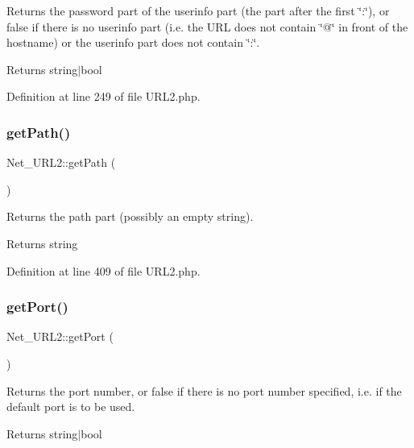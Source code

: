 Returns the password part of the userinfo part (the part after the first \char`\"{}\+:\char`\"{}), or false if there is no userinfo part (i.\+e. the U\+RL does not contain \char`\"{}@\char`\"{} in front of the hostname) or the userinfo part does not contain \char`\"{}\+:\char`\"{}.

\begin{DoxyReturn}{Returns}
string$\vert$bool 
\end{DoxyReturn}


Definition at line 249 of file U\+R\+L2.\+php.

\mbox{\label{classNet__URL2_a1c14da4e4da398c69ab0efcc80b183d2}} 
\subsubsection{\texorpdfstring{get\+Path()}{getPath()}}
{\footnotesize\ttfamily Net\+\_\+\+U\+R\+L2\+::get\+Path (\begin{DoxyParamCaption}{ }\end{DoxyParamCaption})}

Returns the path part (possibly an empty string).

\begin{DoxyReturn}{Returns}
string 
\end{DoxyReturn}


Definition at line 409 of file U\+R\+L2.\+php.

\mbox{\label{classNet__URL2_a3684482beddce2747c3ef0cb5c3e9c64}} 
\subsubsection{\texorpdfstring{get\+Port()}{getPort()}}
{\footnotesize\ttfamily Net\+\_\+\+U\+R\+L2\+::get\+Port (\begin{DoxyParamCaption}{ }\end{DoxyParamCaption})}

Returns the port number, or false if there is no port number specified, i.\+e. if the default port is to be used.

\begin{DoxyReturn}{Returns}
string$\vert$bool 
\end{DoxyReturn}


